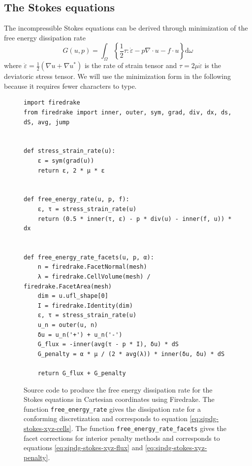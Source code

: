 \documentclass[gmd, manuscript]{copernicus}
\begin{document}
\subsection{The Stokes equations}

The incompressible Stokes equations can be derived through minimization of the free energy dissipation rate
\begin{equation}
    G(u, p) = \int_\Omega\left\{\frac{1}{2}\tau :\dot\varepsilon - p\nabla\cdot u - f\cdot u\right\}\mathrm d\omega
\end{equation}
where $\dot\varepsilon = \frac{1}{2}(\nabla u + \nabla u^*)$ is the rate of strain tensor and $\tau = 2\mu\dot\varepsilon$ is the deviatoric stress tensor.
We will use the minimization form in the following because it requires fewer characters to type.

\begin{figure}
\begin{lstlisting}
import firedrake
from firedrake import inner, outer, sym, grad, div, dx, ds, dS, avg, jump


def stress_strain_rate(u):
    ε = sym(grad(u))
    return ε, 2 * μ * ε


def free_energy_rate(u, p, f):
    ε, τ = stress_strain_rate(u)
    return (0.5 * inner(τ, ε) - p * div(u) - inner(f, u)) * dx


def free_energy_rate_facets(u, p, α):
    n = firedrake.FacetNormal(mesh)
    λ = firedrake.CellVolume(mesh) / firedrake.FacetArea(mesh)
    dim = u.ufl_shape[0]
    I = firedrake.Identity(dim)
    ε, τ = stress_strain_rate(u)
    u_n = outer(u, n)
    δu = u_n('+') + u_n('-')
    G_flux = -inner(avg(τ - p * I), δu) * dS
    G_penalty = α * μ / (2 * avg(λ)) * inner(δu, δu) * dS

    return G_flux + G_penalty
\end{lstlisting}
\caption{Source code to produce the free energy dissipation rate for the Stokes equations in Cartesian coordinates using Firedrake.
    The function \texttt{free\_energy\_rate} gives the dissipation rate for a conforming discretization and corresponds to equation \eqref{eq:sipdg-stokes-xyz-cells}.
    The function \texttt{free\_energy\_rate\_facets} gives the facet corrections for interior penalty methods and corresponds to equations \eqref{eq:sipdg-stokes-xyz-flux} and \eqref{eq:sipdg-stokes-xyz-penalty}.
}
\label{fig:source-code-xyz}
\end{figure}
\end{document}
